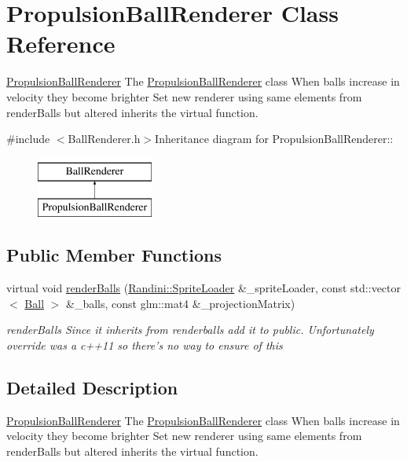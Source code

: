\hypertarget{classPropulsionBallRenderer}{
\section{PropulsionBallRenderer Class Reference}
\label{classPropulsionBallRenderer}
}


\hyperlink{classPropulsionBallRenderer}{PropulsionBallRenderer} The \hyperlink{classPropulsionBallRenderer}{PropulsionBallRenderer} class When balls increase in velocity they become brighter Set new renderer using same elements from renderBalls but altered inherits the virtual function.  


{\ttfamily \#include $<$BallRenderer.h$>$}Inheritance diagram for PropulsionBallRenderer::\begin{figure}[H]
\begin{center}
\leavevmode
\includegraphics[height=2cm]{classPropulsionBallRenderer}
\end{center}
\end{figure}
\subsection*{Public Member Functions}
\begin{DoxyCompactItemize}
\item 
virtual void \hyperlink{classPropulsionBallRenderer_ad3206abdc61b39c3716eed6ed91acaa0}{renderBalls} (\hyperlink{classRandini_1_1SpriteLoader}{Randini::SpriteLoader} \&\_\-spriteLoader, const std::vector$<$ \hyperlink{structBall}{Ball} $>$ \&\_\-balls, const glm::mat4 \&\_\-projectionMatrix)
\begin{DoxyCompactList}\small\item\em renderBalls Since it inherits from renderballs add it to public. Unfortunately override was a c++11 so there's no way to ensure of this \item\end{DoxyCompactList}\end{DoxyCompactItemize}


\subsection{Detailed Description}
\hyperlink{classPropulsionBallRenderer}{PropulsionBallRenderer} The \hyperlink{classPropulsionBallRenderer}{PropulsionBallRenderer} class When balls increase in velocity they become brighter Set new renderer using same elements from renderBalls but altered inherits the virtual function. 


